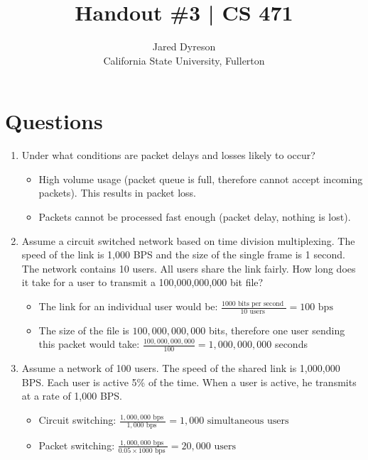 \documentclass{article}
\title{Handout \#3 | CS 471}
\author{Jared Dyreson\\ 
        California State University, Fullerton}
\begin{document}
\maketitle
\tableofcontents

\newpage

\section{Questions}

\begin{enumerate}

\item Under what conditions are packet delays and losses likely to occur?
\begin{itemize}
\item High volume usage (packet queue is full, therefore cannot accept incoming packets). This results in packet loss.
\item Packets cannot be processed fast enough (packet delay, nothing is lost).
\end{itemize}

\item Assume a circuit switched network based on time division multiplexing. The speed of the link is 1,000 BPS and the size of the single frame is 1 second. The network contains 10 users. All users share the link fairly. How long does it take for a user to transmit a 100,000,000,000 bit file?
\begin{itemize}
\item The link for an individual user would be: $\frac{1000 \text{ bits per second }}{10 \text{ users }} = 100 \text{ bps }$
\item The size of the file is $100,000,000,000$ bits, therefore one user sending this packet would take: $\frac{100,000,000,000}{100} = 1,000,000,000$ seconds
\end{itemize}

\item Assume a network of 100 users. The speed of the shared link is 1,000,000 BPS. Each user is active 5\% of the time. When a user is active, he transmits at a rate of 1,000 BPS.
\begin{itemize}
    \item Circuit switching: $\frac{1,000,000 \text{ bps }}{1,000 \text{ bps }} = 1,000 \text{ simultaneous users }$
\item Packet switching: $\frac{1,000,000 \text{ bps }}{0.05 \times 1000 \text{ bps }} = 20,000 \text{ users }$
\end{itemize}


\end{enumerate}
\end{document}
